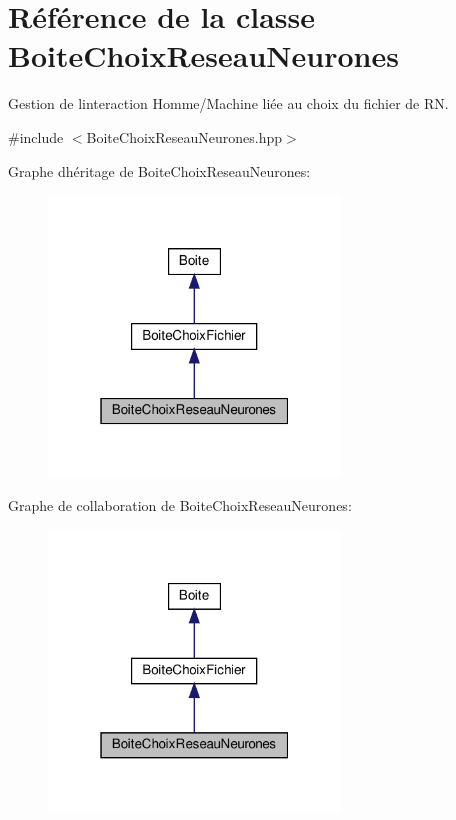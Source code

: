 \hypertarget{class_boite_choix_reseau_neurones}{}\section{Référence de la classe Boite\+Choix\+Reseau\+Neurones}
\label{class_boite_choix_reseau_neurones}


Gestion de l\textquotesingle{}interaction Homme/\+Machine liée au choix du fichier de RN.  




{\ttfamily \#include $<$Boite\+Choix\+Reseau\+Neurones.\+hpp$>$}



Graphe d\textquotesingle{}héritage de Boite\+Choix\+Reseau\+Neurones\+:\nopagebreak
\begin{figure}[H]
\begin{center}
\leavevmode
\includegraphics[width=220pt]{class_boite_choix_reseau_neurones__inherit__graph}
\end{center}
\end{figure}


Graphe de collaboration de Boite\+Choix\+Reseau\+Neurones\+:\nopagebreak
\begin{figure}[H]
\begin{center}
\leavevmode
\includegraphics[width=220pt]{class_boite_choix_reseau_neurones__coll__graph}
\end{center}
\end{figure}
